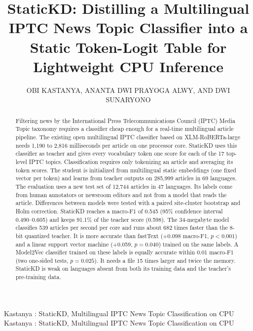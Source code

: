 \documentclass{ieeeaccess}
\begin{document}

\title{StaticKD: Distilling a Multilingual IPTC News Topic Classifier into a Static Token-Logit Table for Lightweight CPU Inference}

\author{\uppercase{Obi Kastanya}, \uppercase{Ananta Dwi Prayoga Alwy}, AND \uppercase{Dwi Sunaryono}}
\address[1]{Department of Informatics Engineering, Sepuluh Nopember Institute of Technology, Surabaya, Indonesia (e-mail: 6025252015@student.its.ac.id; 6025252007@student.its.ac.id; dwi.syn@its.ac.id)}

\markboth
{Kastanya \headeretal: StaticKD, Multilingual IPTC News Topic Classification on CPU}
{Kastanya \headeretal: StaticKD, Multilingual IPTC News Topic Classification on CPU}


\begin{abstract}
Filtering news by the International Press Telecommunications Council (IPTC) Media Topic taxonomy requires a classifier cheap enough for a real-time multilingual article pipeline. The existing open multilingual IPTC classifier based on XLM-RoBERTa-large needs 1,190 to 2,816 milliseconds per article on one processor core. StaticKD uses this classifier as teacher and gives every vocabulary token one score for each of the 17 top-level IPTC topics. Classification requires only tokenizing an article and averaging its token scores. The student is initialized from multilingual static embeddings (one fixed vector per token) and learns from teacher outputs on 285,999 articles in 69 languages. The evaluation uses a new test set of 12,744 articles in 47 languages. Its labels come from human annotators or newsroom editors and not from a model that reads the article. Differences between models were tested with a paired site-cluster bootstrap and Holm correction. StaticKD reaches a macro-F1 of 0.545 (95\% confidence interval 0.490--0.605) and keeps 91.1\% of the teacher score (0.598). The 34-megabyte model classifies 539 articles per second per core and runs about 682 times faster than the 8-bit quantized teacher. It is more accurate than fastText (+0.098 macro-F1, $p<0.001$) and a linear support vector machine (+0.059, $p=0.040$) trained on the same labels. A Model2Vec classifier trained on these labels is equally accurate within 0.01 macro-F1 (two one-sided tests, $p=0.025$). It needs a file 15 times larger and twice the memory. StaticKD is weak on languages absent from both its training data and the teacher's pre-training data.
\end{abstract}
\end{document}
